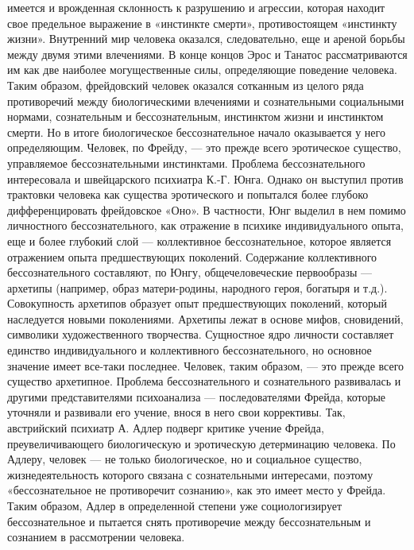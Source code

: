 \documentclass[12pt]{article}
\begin{document}
имеется и врожденная склонность к разрушению и агрессии, которая находит свое предельное выражение в
«инстинкте смерти», противостоящем «инстинкту жизни». Внутренний мир человека оказался, следовательно,
еще и ареной борьбы между двумя этими влечениями. В конце концов Эрос и Танатос рассматриваются им как
две наиболее могущественные силы, определяющие поведение человека.
Таким образом, фрейдовский человек оказался сотканным из целого ряда противоречий между биологическими
влечениями и сознательными социальными нормами, сознательным и бессознательным, инстинктом жизни и
инстинктом смерти. Но в итоге биологическое бессознательное начало оказывается у него определяющим.
Человек, по Фрейду, — это прежде всего эротическое существо, управляемое бессознательными инстинктами.
Проблема бессознательного интересовала и швейцарского психиатра К.-Г. Юнга. Однако он выступил против
трактовки человека как существа эротического и попытался более глубоко дифференцировать фрейдовское
«Оно». В частности, Юнг выделил в нем помимо личностного бессознательного, как отражение в психике
индивидуального  опыта,  еще  и  более  глубокий  слой  —  коллективное  бессознательное,  которое  является 
отражением опыта предшествующих поколений. Содержание коллективного бессознательного составляют, по
Юнгу, общечеловеческие первообразы — архетипы (например, образ матери-родины, народного героя, богатыря
и  т.д.).  Совокупность  архетипов  образует  опыт  предшествующих  поколений,  который  наследуется  новыми
поколениями.  Архетипы  лежат  в  основе  мифов,  сновидений,  символики  художественного  творчества.
Сущностное  ядро  личности  составляет  единство  индивидуального  и  коллективного  бессознательного,  но
основное  значение  имеет  все-таки  последнее.  Человек,  таким  образом,  —  это  прежде  всего  существо
архетипное.
Проблема  бессознательного  и  сознательного  развивалась  и  другими  представителями  психоанализа  —
последователями  Фрейда,  которые  уточняли  и  развивали  его  учение,  внося  в  него  свои  коррективы.  Так,
австрийский  психиатр  А.  Адлер  подверг  критике  учение  Фрейда,  преувеличивающего  биологическую  и
эротическую  детерминацию  человека.  По  Адлеру,  человек  —  не  только  биологическое,  но  и  социальное
существо,  жизнедеятельность  которого  связана  с  сознательными  интересами,  поэтому  «бессознательное  не
противоречит сознанию», как это имеет место у Фрейда. Таким образом, Адлер в определенной степени уже
социологизирует  бессознательное  и  пытается  снять  противоречие  между  бессознательным  и  сознанием  в
рассмотрении человека.
\end{document}
